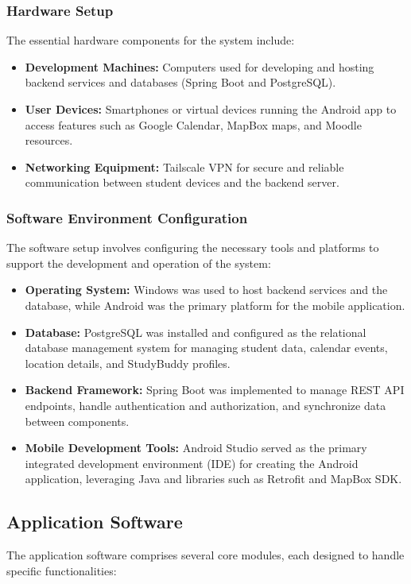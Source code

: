 \documentclass{article}
\begin{document}
\subsubsection{Hardware Setup}  
The essential hardware components for the system include:  
\begin{itemize}  
    \item \textbf{Development Machines: }Computers used for developing and hosting backend services and databases (Spring Boot and PostgreSQL).  
    \item \textbf{User Devices: }Smartphones or virtual devices running the Android app to access features such as Google Calendar, MapBox maps, and Moodle resources.  
    \item \textbf{Networking Equipment: }Tailscale VPN for secure and reliable communication between student devices and the backend server.  
\end{itemize}

\pagebreak

\subsubsection{Software Environment Configuration}  
The software setup involves configuring the necessary tools and platforms to support the development and operation of the system:  
\begin{itemize}  
    \item \textbf{Operating System: }Windows was used to host backend services and the database, while Android was the primary platform for the mobile application.  
    \item \textbf{Database: }PostgreSQL was installed and configured as the relational database management system for managing student data, calendar events, location details, and StudyBuddy profiles.  
    \item \textbf{Backend Framework: }Spring Boot was implemented to manage REST API endpoints, handle authentication and authorization, and synchronize data between components.  
    \item \textbf{Mobile Development Tools: }Android Studio served as the primary integrated development environment (IDE) for creating the Android application, leveraging Java and libraries such as Retrofit and MapBox SDK.  
\end{itemize}

\subsection{Application Software}  
The application software comprises several core modules, each designed to handle specific functionalities:  
\end{document}

